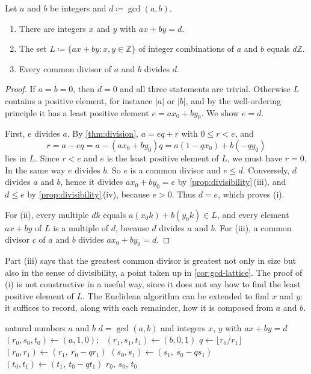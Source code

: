 \begin{theorem}
\label{thm:bezout}
Let $a$ and $b$ be integers and $d\coloneqq\gcd(a,b)$.
\begin{enumerate}
\item There are integers $x$ and $y$ with $ax+by=d$.
\item The set $L\coloneqq\{ax+by: x,y\in\mathbb Z\}$ of integer combinations of $a$ and $b$ equals $d\mathbb Z$.
\item Every common divisor of $a$ and $b$ divides $d$.
\end{enumerate}
\end{theorem}

\begin{proof}
If $a=b=0$, then $d=0$ and all three statements are trivial. Otherwise $L$ contains a positive element, for instance $|a|$ or $|b|$, and by the well-ordering principle it has a least positive element $e=ax_0+by_0$. We show $e=d$.

First, $e$ divides $a$. By \cref{thm:division}, $a=eq+r$ with $0\le r<e$, and
\[
r=a-eq=a-(ax_0+by_0)q=a(1-qx_0)+b(-qy_0)
\]
lies in $L$. Since $r<e$ and $e$ is the least positive element of $L$, we must have $r=0$. In the same way $e$ divides $b$. So $e$ is a common divisor and $e\le d$. Conversely, $d$ divides $a$ and $b$, hence it divides $ax_0+by_0=e$ by \cref{prop:divisibility}\,(iii), and $d\le e$ by \cref{prop:divisibility}\,(iv), because $e>0$. Thus $d=e$, which proves (i).

For (ii), every multiple $dk$ equals $a(x_0k)+b(y_0k)\in L$, and every element $ax+by$ of $L$ is a multiple of $d$, because $d$ divides $a$ and $b$. For (iii), a common divisor $c$ of $a$ and $b$ divides $ax_0+by_0=d$.
\end{proof}

Part (iii) says that the greatest common divisor is greatest not only in size but also in the sense of divisibility, a point taken up in \cref{cor:gcd-lattice}. The proof of (i) is not constructive in a useful way, since it does not say how to find the least positive element of $L$. The Euclidean algorithm can be extended to find $x$ and $y$: it suffices to record, along with each remainder, how it is composed from $a$ and $b$.

\begin{algorithm}
\begin{algorithmic}[1]
\Require natural numbers $a$ and $b$
\Ensure $d=\gcd(a,b)$ and integers $x$, $y$ with $ax+by=d$
\State $(r_0,s_0,t_0)\gets(a,1,0)$; \ $(r_1,s_1,t_1)\gets(b,0,1)$
 
  \State $q\gets\lfloor r_0/r_1\rfloor$
  \State $(r_0,r_1)\gets(r_1,\ r_0-qr_1)$
  \State $(s_0,s_1)\gets(s_1,\ s_0-qs_1)$
  \State $(t_0,t_1)\gets(t_1,\ t_0-qt_1)$
\EndWhile
\State \Return $r_0$, $s_0$, $t_0$
\end{algorithmic}
\caption{The extended Euclidean algorithm. The values $r_0$, $r_1$ run through the same sequence as in \cref{alg:euclid}; the coefficients $s$ and $t$ express each remainder as a combination of $a$ and $b$.}
\label{alg:ext-euclid}
\end{algorithm}

